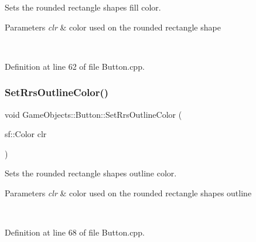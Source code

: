 Sets the rounded rectangle shape\textquotesingle{}s fill color. 


\begin{DoxyParams}{Parameters}
{\em clr} & color used on the rounded rectangle shape \begin{DoxyVerb}\end{DoxyVerb}
 \\
\hline
\end{DoxyParams}


Definition at line 62 of file Button.\+cpp.


\begin{DoxyCode}{0}

\end{DoxyCode}
\mbox{\label{class_game_objects_1_1_button_ae4dc64a6c94fbbd37f184398f7aa5d5e}} 
\subsubsection{\texorpdfstring{SetRrsOutlineColor()}{SetRrsOutlineColor()}}
{\footnotesize\ttfamily void Game\+Objects\+::\+Button\+::\+Set\+Rrs\+Outline\+Color (\begin{DoxyParamCaption}\item[{sf\+::\+Color}]{clr }\end{DoxyParamCaption})}



Sets the rounded rectangle shape\textquotesingle{}s outline color. 


\begin{DoxyParams}{Parameters}
{\em clr} & color used on the rounded rectangle shape\textquotesingle{}s outline \begin{DoxyVerb}\end{DoxyVerb}
 \\
\hline
\end{DoxyParams}


Definition at line 68 of file Button.\+cpp.


\begin{DoxyCode}{0}

\end{DoxyCode}
\mbox{\label{class_game_objects_1_1_button_a0a7324d60360eb565116261171aaf6ba}} 
